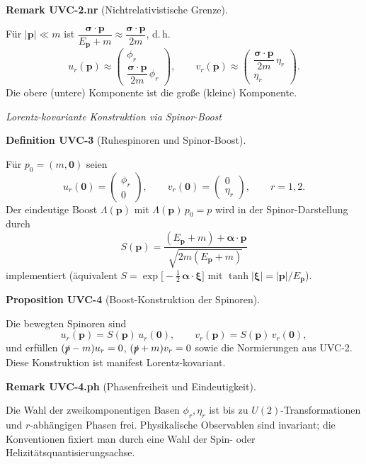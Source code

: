 \documentclass[10pt, letterpaper]{article}
\newcommand{\CustomHeading}[3]{%
  \par\medskip\noindent%
  \textbf{#1 #2} \textnormal{(#3)}.\enskip%
}
\newenvironment{DEF}[2]{\begin{unitbox}\CustomHeading{Definition}{#1}{#2}}{\end{unitbox}}
\newenvironment{PROP}[2]{\begin{unitbox}\CustomHeading{Proposition}{#1}{#2}}{\end{unitbox}}
\newenvironment{REM}[2]{\begin{unitbox}\CustomHeading{Remark}{#1}{#2}}{\end{unitbox}}
\begin{document}
\begin{REM}{UVC-2.nr}{Nichtrelativistische Grenze}
Für $|\mathbf p|\ll m$ ist $\dfrac{\boldsymbol\sigma\cdot\mathbf p}{E_{\mathbf p}+m}\approx\dfrac{\boldsymbol\sigma\cdot\mathbf p}{2m}$, d.\,h.
\[
u_r(\mathbf p)\approx
\begin{pmatrix}\phi_r\\[2pt]\dfrac{\boldsymbol\sigma\cdot\mathbf p}{2m}\,\phi_r\end{pmatrix},\qquad
v_r(\mathbf p)\approx
\begin{pmatrix}\dfrac{\boldsymbol\sigma\cdot\mathbf p}{2m}\,\eta_r\\[2pt]\eta_r\end{pmatrix}.
\]
Die obere (untere) Komponente ist die große (kleine) Komponente.
\end{REM}

\emph{Lorentz-kovariante Konstruktion via Spinor-Boost}

\begin{DEF}{UVC-3}{Ruhespinoren und Spinor-Boost}
Für $p_0=(m,\mathbf 0)$ seien
\[
u_r(\mathbf 0)=\begin{pmatrix}\phi_r\\0\end{pmatrix},\qquad
v_r(\mathbf 0)=\begin{pmatrix}0\\\eta_r\end{pmatrix},\qquad r=1,2.
\]
Der eindeutige Boost $\Lambda(\mathbf p)$ mit $\Lambda(\mathbf p)\,p_0=p$ wird in der Spinor-Darstellung durch
\[
S(\mathbf p)=\frac{(E_{\mathbf p}+m)+\boldsymbol\alpha\cdot\mathbf p}{\sqrt{2m(E_{\mathbf p}+m)}}
\]
implementiert (äquivalent $S=\exp\!\big[-\tfrac12\,\boldsymbol\alpha\cdot\boldsymbol\xi\big]$ mit $\tanh|\boldsymbol\xi|=|\mathbf p|/E_{\mathbf p}$).
\end{DEF}

\begin{PROP}{UVC-4}{Boost-Konstruktion der Spinoren}
Die bewegten Spinoren sind
\[
u_r(\mathbf p)=S(\mathbf p)\,u_r(\mathbf 0),\qquad
v_r(\mathbf p)=S(\mathbf p)\,v_r(\mathbf 0),
\]
und erfüllen $(\slashed p-m)u_r=0$, $(\slashed p+m)v_r=0$ sowie die Normierungen aus \textsc{UVC-2}. Diese Konstruktion ist manifest Lorentz-kovariant.
\end{PROP}

\begin{REM}{UVC-4.ph}{Phasenfreiheit und Eindeutigkeit}
Die Wahl der zweikomponentigen Basen $\phi_r,\eta_r$ ist bis zu $U(2)$-Transformationen und $r$-abhängigen Phasen frei. Physikalische Observablen sind invariant; die Konventionen fixiert man durch eine Wahl der Spin- oder Helizitätsquantisierungsachse.
\end{REM}
\end{document}
